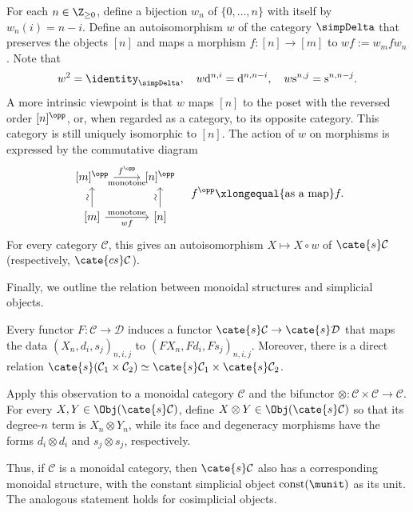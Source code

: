 \begin{remark}\label{rem:simpDelta-order-reversal}
	For each $n\in\Z_{\geq0}$, define a bijection $w_n$ of
	$\{0,\ldots,n\}$ with itself by $w_n(i)=n-i$. Define an autoisomorphism
	$w$ of the category $\simpDelta$ that preserves the objects $[n]$ and maps
	a morphism $f:[n]\to[m]$ to $wf:=w_mfw_n$. Note that
	\[ w^2 = \identity_{\simpDelta}, \quad w \mathrm{d}^{n, i} = \mathrm{d}^{n, n-i}, \quad w \mathrm{s}^{n, j} = \mathrm{s}^{n, n-j}. \]
	A more intrinsic viewpoint is that $w$ maps $[n]$ to the poset with the
	reversed order $[n]^{\opp}$, or, when regarded as a category, to its
	opposite category. This category is still uniquely isomorphic to $[n]$.
	The action of $w$ on morphisms is expressed by the commutative diagram
	\[\begin{tikzcd}
		{[m]^{\opp}} \arrow[r, "{f^{\opp}}", "\text{monotone}"'] & {[n]^{\opp}} \\
		{[m]} \arrow[r, "\text{monotone}", "{wf}"'] \arrow[u, "\sim" sloped] & {[n]} \arrow[u, "\sim" sloped]
	\end{tikzcd} \quad f^{\opp} \xlongequal{\text{as a map}} f. \]
	For every category $\mathcal{C}$, this gives an autoisomorphism
	$X\mapsto X\circ w$ of $\cate{s}\mathcal{C}$ (respectively,
	$\cate{cs}\mathcal{C}$).
\end{remark}

Finally, we outline the relation between monoidal structures and simplicial
objects.

\begin{definition}\label{def:monoidal-sObj}
	Every functor $F:\mathcal{C}\to\mathcal{D}$ induces a functor
	$\cate{s}\mathcal{C}\to\cate{s}\mathcal{D}$ that maps the data
	$(X_n,d_i,s_j)_{n,i,j}$ to $(FX_n,Fd_i,Fs_j)_{n,i,j}$. Moreover, there is
	a direct relation
	$\cate{s}(\mathcal{C}_1\times\mathcal{C}_2)\simeq
	\cate{s}\mathcal{C}_1\times\cate{s}\mathcal{C}_2$.

	Apply this observation to a monoidal category $\mathcal{C}$ and the
	bifunctor $\otimes:\mathcal{C}\times\mathcal{C}\to\mathcal{C}$. For
	every $X,Y\in\Obj(\cate{s}\mathcal{C})$, define
	$X\otimes Y\in\Obj(\cate{s}\mathcal{C})$ so that its degree-$n$ term is
	$X_n\otimes Y_n$, while its face and degeneracy morphisms have the forms
	$d_i\otimes d_i$ and $s_j\otimes s_j$, respectively.
\end{definition}

Thus, if $\mathcal{C}$ is a monoidal category, then
$\cate{s}\mathcal{C}$ also has a corresponding monoidal structure, with the
constant simplicial object $\mathrm{const}(\munit)$ as its unit. The analogous
statement holds for cosimplicial objects.
